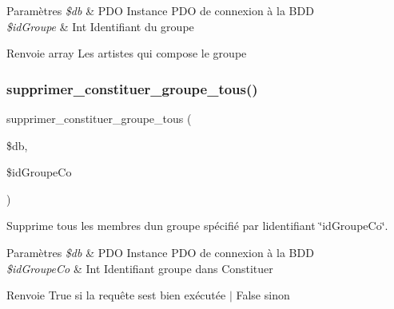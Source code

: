 \begin{DoxyParams}{Paramètres}
{\em \$db} & P\+DO Instance P\+DO de connexion à la B\+DD \\
\hline
{\em \$id\+Groupe} & Int Identifiant du groupe \\
\hline
\end{DoxyParams}
\begin{DoxyReturn}{Renvoie}
array Les artistes qui compose le groupe 
\end{DoxyReturn}
\mbox{\label{fonctionGroupe_8php_aa892ed08a68e4ad21dc2619405477c22}} 
\subsubsection{\texorpdfstring{supprimer\+\_\+constituer\+\_\+groupe\+\_\+tous()}{supprimer\_constituer\_groupe\_tous()}}
{\footnotesize\ttfamily supprimer\+\_\+constituer\+\_\+groupe\+\_\+tous (\begin{DoxyParamCaption}\item[{}]{\$db,  }\item[{}]{\$id\+Groupe\+Co }\end{DoxyParamCaption})}



Supprime tous les membres d\textquotesingle{}un groupe spécifié par l\textquotesingle{}identifiant \char`\"{}id\+Groupe\+Co\char`\"{}. 


\begin{DoxyParams}{Paramètres}
{\em \$db} & P\+DO Instance P\+DO de connexion à la B\+DD \\
\hline
{\em \$id\+Groupe\+Co} & Int Identifiant groupe dans Constituer \\
\hline
\end{DoxyParams}
\begin{DoxyReturn}{Renvoie}
True si la requête s\textquotesingle{}est bien exécutée $\vert$ False sinon 
\end{DoxyReturn}
\mbox{\label{fonctionGroupe_8php_a2cccf196483476d1bb39f93e718f2463}} 
